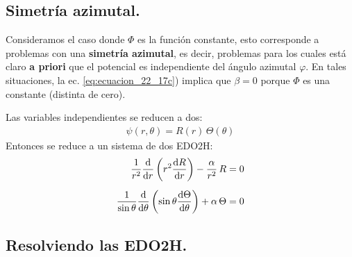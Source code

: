 \documentclass[12pt]{article}
\numberwithin{equation}{section}
\begin{document}
\subsection{Simetría azimutal.}

Consideramos el caso donde $\Phi$ es la función constante,  esto corresponde a problemas con una \textbf{simetría azimutal},  es decir, problemas para los cuales está claro \textbf{a priori} que el potencial es independiente del ángulo azimutal $\varphi$. En tales situaciones, la ec. \ref{eq:ecuacion_22_17c}) implica que $\beta = 0$ porque $\Phi$ es una constante (distinta de cero).
\par
Las variables independientes se reducen a dos: 
\begin{align*}
\psi (r, \theta) = R (r) \, \Theta (\theta)    
\end{align*}
Entonces se reduce a un sistema de dos EDO2H:
\begin{eqnarray}
\begin{aligned}
\dfrac{1}{r^{2}} \dv{r} \left( r^{2} \dv{R}{r} \right) - \dfrac{\alpha}{r^{2}} \, R &= 0 \\[0.5em]  
\dfrac{1}{\sin \theta} \dv{\theta} \left( \sin \theta \dv{\Theta}{\theta} \right) + \alpha \, \Theta &= 0
\end{aligned}
\label{eq:ecuacion_26_02}
\end{eqnarray}

\subsection{Resolviendo las EDO2H.}
\end{document}
